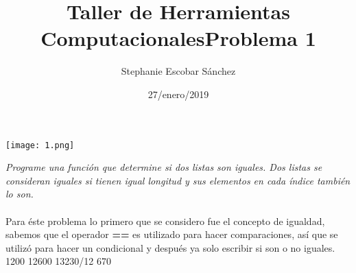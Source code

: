 \documentclass{article}
\title{\Huge Taller de Herramientas Computacionales}
\author{Stephanie Escobar Sánchez}
\date{27/enero/2019}
\begin{document}
	\maketitle
	\begin{center}
		\texttt{[image: 1.png]}	
	\end{center}
	\newpage
	\begin{center}
		\title {\Huge Problema 1} 
	\end{center}

\textit{Programe una función que determine si dos listas son iguales. Dos listas se
	consideran iguales si tienen igual longitud y sus elementos en cada índice
	también lo son.}\\
\\
Para éste problema lo primero que se considero fue el concepto de igualdad, sabemos que el operador \textbf{==} es utilizado para hacer comparaciones, así que se utilizó  para hacer un condicional y después ya solo escribir si son o no iguales.
1200
12600
13230/12
670
\end{document}
